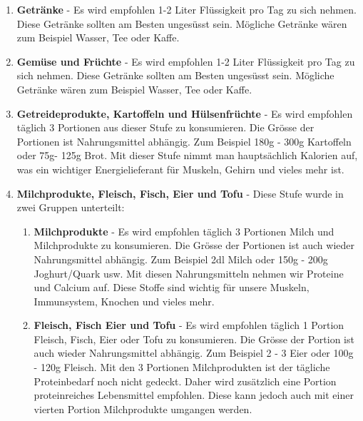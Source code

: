 \begin{enumerate}
  \item \textbf{Getränke} - Es wird empfohlen 1-2 Liter Flüssigkeit pro Tag zu sich nehmen. Diese Getränke sollten am Besten ungesüsst sein. Mögliche Getränke wären zum Beispiel Wasser, Tee oder Kaffe. \cite{stufe_getraenke}
  \item \textbf{Gemüse und Früchte} - Es wird empfohlen 1-2 Liter Flüssigkeit pro Tag zu sich nehmen. Diese Getränke sollten am Besten ungesüsst sein. Mögliche Getränke wären zum Beispiel Wasser, Tee oder Kaffe. \cite{stufe_gemuese_fruechte}
  \item \textbf{Getreideprodukte, Kartoffeln und Hülsenfrüchte} - Es wird empfohlen täglich 3 Portionen aus dieser Stufe zu konsumieren. Die Grösse der Portionen ist Nahrungsmittel abhängig. Zum Beispiel 180g - 300g Kartoffeln oder 75g- 125g Brot.
  \newline
  Mit dieser Stufe nimmt man hauptsächlich Kalorien auf, was ein wichtiger Energielieferant für Muskeln, Gehirn und vieles mehr ist. \cite{stufe_getreideprodukte_kartoffeln_huelsenfruechte}
  \item \textbf{Milchprodukte, Fleisch, Fisch, Eier und Tofu} - Diese Stufe wurde in zwei Gruppen unterteilt: 
    \begin{enumerate}
    \item \textbf{Milchprodukte} - Es wird empfohlen täglich 3 Portionen Milch und Milchprodukte zu konsumieren. Die Grösse der Portionen ist auch wieder Nahrungsmittel abhängig. Zum Beispiel 2dl Milch oder 150g - 200g Joghurt/Quark usw.
    \newline
    Mit diesen Nahrungsmitteln nehmen wir Proteine und Calcium auf. Diese Stoffe sind wichtig für unsere Muskeln, Immunsystem, Knochen und vieles mehr. \cite{stufe_milch_milchprodukte}
    \item \textbf{Fleisch, Fisch Eier und Tofu} - Es wird empfohlen täglich 1 Portion Fleisch, Fisch, Eier oder Tofu zu konsumieren. Die Grösse der Portion ist auch wieder Nahrungsmittel abhängig. Zum Beispiel 2 - 3 Eier oder 100g - 120g Fleisch.
    \newline
    Mit den 3 Portionen Milchprodukten ist der tägliche Proteinbedarf noch nicht gedeckt. 
    \newline
    Daher wird zusätzlich eine Portion proteinreiches Lebensmittel empfohlen. Diese kann jedoch auch mit einer vierten Portion Milchprodukte umgangen werden. \cite{stufe_fleisch_fisch_eier_tofu_2}
  \end{enumerate}

\end{enumerate}

